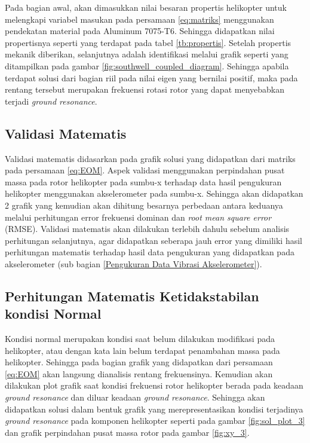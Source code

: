 Pada bagian awal, akan dimasukkan nilai besaran propertis helikopter untuk melengkapi variabel masukan pada persamaan \ref{eq:matriks} menggunakan pendekatan material pada Aluminum 7075-T6. Sehingga didapatkan nilai propertisnya seperti yang terdapat pada tabel \ref{tb:propertis}. Setelah propertis mekanik diberikan, selanjutnya adalah identifikasi melalui grafik seperti yang ditampilkan pada gambar \ref{fig:southwell_coupled_diagram}. Sehingga apabila terdapat solusi dari bagian riil pada nilai eigen yang bernilai positif, maka pada rentang tersebut merupakan frekuensi rotasi rotor yang dapat menyebabkan terjadi \textit{ground resonance}.

\subsection{Validasi Matematis}

Validasi matematis didasarkan pada grafik solusi yang didapatkan dari matriks pada persamaan \ref{eq:EOM}. Aspek validasi menggunakan perpindahan pusat massa pada rotor helikopter pada sumbu-x terhadap data hasil pengukuran helikopter menggunakan akselerometer pada sumbu-x. Sehingga akan didapatkan 2 grafik yang kemudian akan dihitung besarnya perbedaan antara keduanya melalui perhitungan error frekuensi dominan dan \textit{root mean square error} (RMSE). Validasi matematis akan dilakukan terlebih dahulu sebelum analisis perhitungan selanjutnya, agar didapatkan seberapa jauh error yang dimiliki hasil perhitungan matematis terhadap hasil data pengukuran yang didapatkan pada akselerometer (sub bagian \ref{Pengukuran Data Vibrasi Akselerometer}).

\subsection{Perhitungan Matematis Ketidakstabilan kondisi Normal}

Kondisi normal merupakan kondisi saat belum dilakukan modifikasi pada helikopter, atau dengan kata lain belum terdapat penambahan massa pada helikopter. Sehingga pada bagian grafik yang didapatkan dari persamaan \ref{eq:EOM} akan langsung dianalisis rentang frekuensinya. Kemudian akan dilakukan plot grafik saat kondisi frekuensi rotor helikopter berada pada keadaan \textit{ground resonance} dan diluar keadaan \textit{ground resonance}. Sehingga akan didapatkan solusi dalam bentuk grafik yang merepresentasikan kondisi terjadinya \textit{ground resonance} pada komponen helikopter seperti pada gambar \ref{fig:sol_plot_3} dan grafik perpindahan pusat massa rotor pada gambar \ref{fig:xy_3}.

